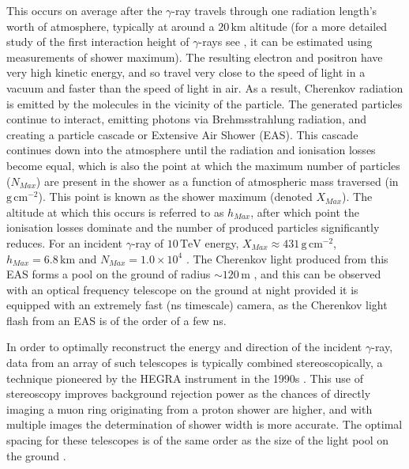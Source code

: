 This occurs on average after the $\gamma$-ray travels through one radiation length's worth of atmosphere, typically at around a $\mathrm{20\,km}$ altitude \cite{weekesgamma} (for a more detailed study of the first interaction height of $\gamma$-rays see \cite{Sitarek1i}, it can be estimated using measurements of shower maximum). The resulting electron and positron have very high kinetic energy, and so travel very close to the speed of light in a vacuum and faster than the speed of light in air. As a result, Cherenkov radiation is emitted by the molecules in the vicinity of the particle. The generated particles continue to interact, emitting photons via Brehmsstrahlung radiation, and creating a particle cascade or Extensive Air Shower (EAS). This cascade continues down into the atmosphere until the radiation and ionisation losses become equal, which is also the point at which the maximum number of particles ($N_{Max}$) are present in the shower as a function of atmospheric mass traversed (in $\mathrm{g\,cm^{-2}}$). This point is known as the shower maximum (denoted $X_{Max}$). The altitude at which this occurs is referred to as $h_{Max}$, after which point the ionisation losses dominate and the number of produced particles significantly reduces. For an incident $\gamma$-ray of $\mathrm{10\,TeV}$ energy, $X_{Max}\approx \mathrm{431\,g\,cm^{-2}}$, $h_{Max}=\mathrm{6.8\,km}$ and $N_{Max}=\mathrm{1.0 \times 10^4}$ \cite{weekesgamma}.  The Cherenkov light produced from this EAS forms a pool on the ground of radius $\mathrm{\sim120\,m}$ \cite{weekesgamma}, and this can be observed with an optical frequency telescope on the ground at night provided it is equipped with an extremely fast (ns timescale) camera, as the Cherenkov light flash from an 
EAS is of the order of a few ns. 

In order to optimally reconstruct the energy and direction of the incident $\gamma$-ray, data from an array of such telescopes is typically combined stereoscopically, a technique pioneered by the HEGRA instrument in the 1990s \cite{HEGRA}. This use of stereoscopy improves background rejection power as the chances of directly imaging a muon ring originating from a proton shower are higher, and with multiple images the determination of shower width is more accurate.  The optimal spacing for these telescopes is of the same order as the size of the light pool on the ground \cite{weekesgamma}.

